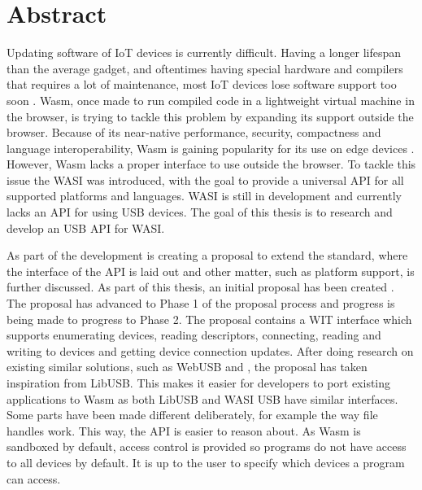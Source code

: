 \chapter*{Abstract}

Updating software of \acrfull{IoT} devices is currently difficult. Having a longer lifespan than the average gadget, and oftentimes having special hardware and compilers that requires a lot of maintenance, most \acrshort{IoT} devices lose software support too soon \cite{wasi_iot}.
\acrfull{Wasm}, once made to run compiled code in a lightweight virtual machine in the browser, is trying to tackle this problem by expanding its support outside the browser. Because of its near-native performance, security, compactness and language interoperability, \acrshort{Wasm} is gaining popularity for its use on edge devices \cite{wasi_iot}. However, \acrshort{Wasm} lacks a proper interface to use outside the browser. To tackle this issue the \acrfull{WASI} was introduced, with the goal to provide a universal \acrshort{API} for all supported platforms and languages. \acrshort{WASI} is still in development and currently lacks an \acrshort{API} for using USB devices. The goal of this thesis is to research and develop an \acrshort{USB} \acrshort{API} for \acrshort{WASI}.

As part of the development is creating a proposal to extend the standard, where the interface of the \acrshort{API} is laid out and other matter, such as platform support, is further discussed. As part of this thesis, an initial proposal has been created \cite{wasi_usb}. The proposal has advanced to Phase 1 of the proposal process \cite{proposal_phases} and progress is being made to progress to Phase 2. The proposal contains a \acrshort{WIT} interface which supports enumerating devices, reading descriptors, connecting, reading and writing to devices and getting device connection updates. After doing research on existing similar solutions, such as WebUSB \cite{WebUSB} and \cite{LibUSB}, the proposal has taken inspiration from LibUSB. This makes it easier for developers to port existing applications to \acrshort{Wasm} as both LibUSB and \acrshort{WASI} \acrshort{USB} have similar interfaces. Some parts have been made different deliberately, for example the way file handles work. This way, the \acrshort{API} is easier to reason about. As \acrshort{Wasm} is sandboxed by default, access control is provided so programs do not have access to all devices by default. It is up to the user to specify which devices a program can access.

